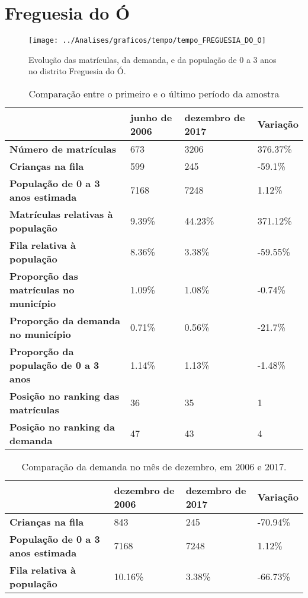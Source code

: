 \section{Freguesia do Ó}
\begin{figure}[H]
\centering
\texttt{[image: ../Analises/graficos/tempo/tempo\_FREGUESIA\_DO\_O]}
\caption{Evolução das matrículas, da demanda, e da população de 0 a 3 anos no distrito Freguesia do Ó.}
\end{figure}
\begin{table}[H]
\begin{tabular}{|l|l|l|l|}
\hline
\textbf{}                                      & \textbf{junho de 2006}       & \textbf{dezembro de 2017}    & \textbf{Variação} \\ \hline
\textbf{Número de matrículas}                  & 673 & 3206 & 376.37\% \\ \hline
\textbf{Crianças na fila}                      & 599 & 245 & -59.1\% \\ \hline
\textbf{População de 0 a 3 anos estimada}      & 7168 & 7248 & 1.12\% \\ \hline
\textbf{Matrículas relativas à população}      & 9.39\% & 44.23\% & 371.12\% \\ \hline
\textbf{Fila relativa à população}             & 8.36\% & 3.38\% & -59.55\% \\ \hline
\textbf{Proporção das matrículas no município} & 1.09\% & 1.08\% & -0.74\% \\ \hline
\textbf{Proporção da demanda no município}     & 0.71\% & 0.56\% & -21.7\% \\ \hline
\textbf{Proporção da população de 0 a 3 anos}  & 1.14\% & 1.13\% & -1.48\% \\ \hline
\textbf{Posição no ranking das matrículas}     & 36 & 35 & 1 \\ \hline
\textbf{Posição no ranking da demanda}         & 47 & 43 & 4 \\ \hline
\end{tabular}
\caption{Comparação entre o primeiro e o último período da amostra}
\end{table}
\begin{table}[H]
\begin{tabular}{|l|l|l|l|}
\hline
\textbf{}                                 & \textbf{dezembro de 2006} & \textbf{dezembro de 2017} & \textbf{Variação} \\ \hline
\textbf{Crianças na fila}                      & 843 & 245 & -70.94\% \\ \hline
\textbf{População de 0 a 3 anos estimada}      & 7168 & 7248 & 1.12\% \\ \hline
\textbf{Fila relativa à população}             & 10.16\% & 3.38\% & -66.73\% \\ \hline
\end{tabular}
\caption{Comparação da demanda no mês de dezembro, em 2006 e 2017.}
\end{table}
